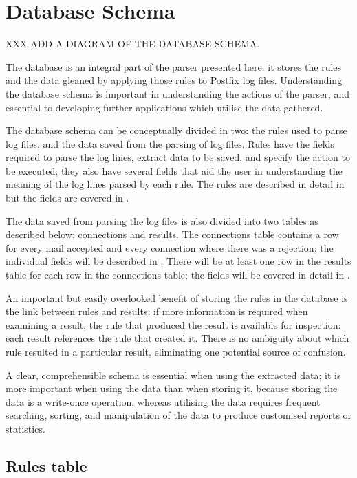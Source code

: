 \section{Database Schema}
\label{database schema}

XXX ADD A DIAGRAM OF THE DATABASE SCHEMA\@.

The database is an integral part of the parser presented here: it stores
the rules and the data gleaned by applying those rules to Postfix log
files.  Understanding the database schema is important in understanding the
actions of the parser, and essential to developing further applications
which utilise the data gathered.

The database schema can be conceptually divided in two: the rules used to
parse log files, and the data saved from the parsing of log files.  Rules
have the fields required to parse the log lines, extract data to be saved,
and specify the action to be executed; they also have several fields that
aid the user in understanding the meaning of the log lines parsed by each
rule.  The rules are described in detail in  but the
fields are covered in .

The data saved from parsing the log files is also divided into two tables
as described below: connections and results.  The connections table
contains a row for every mail accepted and every connection where there was
a rejection; the individual fields will be described in
.  There will be at least one row in the
results table for each row in the connections table; the fields will be
covered in detail in .

An important but easily overlooked benefit of storing the rules in the
database is the link between rules and results: if more information is
required when examining a result, the rule that produced the result is
available for inspection: each result references the rule that created it.
There is no ambiguity about which rule resulted in a particular result,
eliminating one potential source of confusion.

A clear, comprehensible schema is essential when using the extracted data;
it is more important when using the data than when storing it, because
storing the data is a write-once operation, whereas utilising the data
requires frequent searching, sorting, and manipulation of the data to
produce customised reports or statistics.

\subsection{Rules table}

